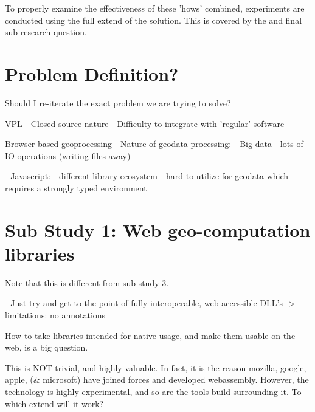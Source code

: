 To properly examine the effectiveness of these 'hows' combined, experiments are conducted using the full extend of the solution. This is covered by the  and final sub-research question.


\section{Problem Definition?}

Should I re-iterate the exact problem we are trying to solve? 

VPL
- Closed-source nature 
- Difficulty to integrate with 'regular' software

Browser-based geoprocessing
- Nature of geodata processing: 
  - Big data 
  - lots of IO operations (writing files away)

- Javascript:
  - different library ecosystem 
  - hard to utilize for geodata which requires a strongly typed environment 



\section{Sub Study 1: Web geo-computation libraries}
\label{sec:method-one}

\begin{note}
  Note that this is different from sub study 3.

  - Just try and get to the point of fully interoperable, web-accessible DLL's
    -> limitations: no annotations 

\end{note}
\mySubRQOne

How to take libraries intended for native usage, and make them usable on the web, is a big question. 

This is NOT trivial, and highly valuable.  In fact, it is the reason mozilla, google, apple, (\& microsoft) have joined forces and developed webassembly. However, the technology is highly experimental, and so are the tools build surrounding it. To which extend will it work?



